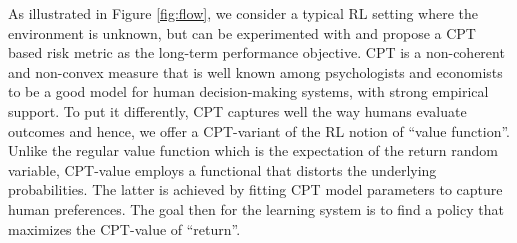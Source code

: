 As illustrated in Figure \ref{fig:flow}, we consider a typical RL setting where the environment is unknown, but can be experimented with and propose a CPT based risk metric as the long-term performance objective.  
CPT is a non-coherent and non-convex measure 
that is well known among psychologists and economists to be a good model for human decision-making systems, with strong empirical support.
To put it differently, CPT captures well the way humans evaluate outcomes and hence, we offer a CPT-variant of the RL notion of ``value function''. Unlike the regular value function which is the expectation of the return random variable, CPT-value employs a functional that distorts the underlying probabilities. The latter is achieved by fitting CPT model parameters to capture human preferences. The goal then for the learning system is to find a policy that maximizes the CPT-value of ``return''. 
\fi
%
%

